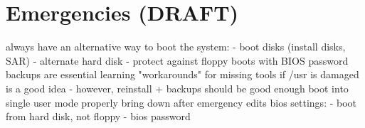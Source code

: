 \chapter{Emergencies (DRAFT)}

\meta
always have an alternative way to boot the system:
	- boot disks (install disks, SAR)
	- alternate hard disk
	- protect against floppy boots with BIOS password
backups are essential
learning "workarounds" for missing tools if /usr is damaged is a good idea
	- however, reinstall + backups should be good enough
boot into single user mode
properly bring down after emergency edits
bios settings:
	- boot from hard disk, not floppy
	- bios password
